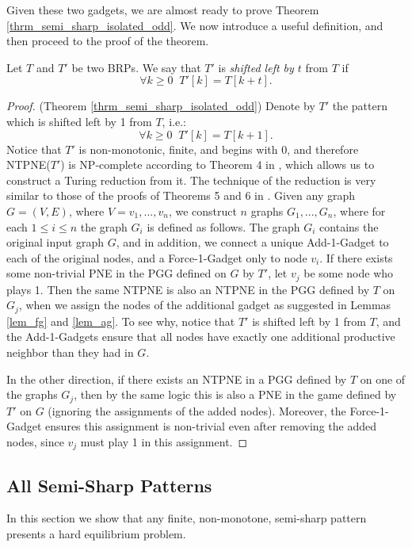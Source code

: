 \documentclass[runningheads]{llncs}
\begin{document}
Given these two gadgets, we are almost ready to prove Theorem \ref{thrm_semi_sharp_isolated_odd}. We now introduce a useful definition, and then proceed to the proof of the theorem.
\begin{definition}
Let $T$ and $T'$ be two BRPs. We say that $T'$ is \textit{shifted left by $t$} from $T$ if
\[\forall k\geq 0 \;\; T'[k]=T[k+t].\]
\end{definition}

\begin{proof}
(Theorem \ref{thrm_semi_sharp_isolated_odd}) Denote by $T'$ the pattern which is shifted left by 1 from $T$, i.e.:
\[\forall k\geq 0 \;\; T'[k]=T[k+1].\]
Notice that $T'$ is non-monotonic, finite, and begins with $0$, and therefore NTPNE($T'$) is NP-complete according to Theorem 4 in \cite{Gilboa_Nisan_public_goods}, which allows us to construct a Turing reduction from it.
The technique of the reduction is very similar to those of the proofs of Theorems 5 and 6 in \cite{Gilboa_Nisan_public_goods}.
Given any graph $G=(V,E)$, where $V={v_1,...,v_n}$, we construct $n$ graphs $G_1,...,G_n$, where for each $1\leq i\leq n$ the graph $G_i$ is defined as follows. The graph $G_i$ contains the original input graph $G$, and in addition, we connect a unique Add-1-Gadget to each of the original nodes, and a Force-1-Gadget only to node $v_i$. If there exists some non-trivial PNE in the PGG defined on $G$ by $T'$, let $v_j$ be some node who plays 1. Then the same NTPNE is also an NTPNE in the PGG defined by $T$ on $G_j$, when we assign the nodes of the additional gadget as suggested in Lemmas \ref{lem_fg} and \ref{lem_ag}. To see why, notice that $T'$ is shifted left by 1 from $T$, and the Add-1-Gadgets ensure that all nodes have exactly one additional productive neighbor than they had in $G$.

In the other direction, if there exists an NTPNE in a PGG defined by $T$ on one of the graphs $G_j$, then by the same logic this is also a PNE in the game defined by $T'$ on $G$ (ignoring the assignments of the added nodes). Moreover, the Force-1-Gadget ensures this assignment is non-trivial even after removing the added nodes, since $v_j$ must play 1 in this assignment.
\end{proof}

\subsection{All Semi-Sharp Patterns}
\label{sec_all_semi_shrp}
In this section we show that any finite, non-monotone, semi-sharp pattern presents a hard equilibrium problem.
\end{document}
